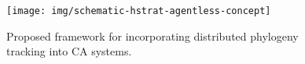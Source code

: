 \begin{figure}
\centering
\texttt{[image: img/schematic-hstrat-agentless-concept]}
\caption{Proposed framework for incorporating distributed phylogeny tracking into CA systems.}
\label{fig:hstrat-agentless-concept}
\end{figure}

